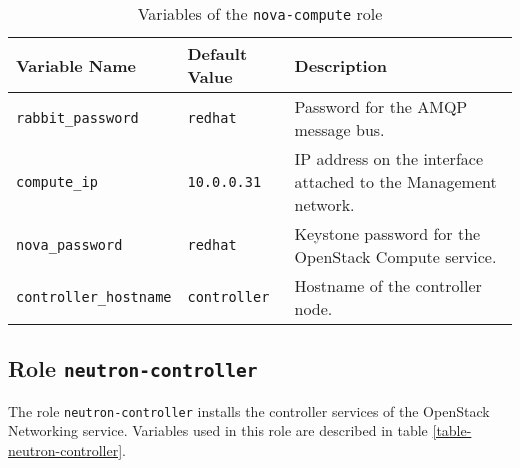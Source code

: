 \begin{table}[!h]
  \centering
  \begin{tabular}{|l|l|p{5cm}|}\hline
    Variable Name & Default Value & Description \\\hline
    \texttt{rabbit\_password} & \texttt{redhat} & Password for the AMQP message bus. \\\hline

    \texttt{compute\_ip} & \texttt{10.0.0.31} & IP address on the interface attached to the Management network. \\\hline
    \texttt{nova\_password} & \texttt{redhat} & Keystone password for the OpenStack Compute service. \\\hline
    \texttt{controller\_hostname} & \texttt{controller} & Hostname of the controller node. \\\hline

  \end{tabular}
\caption{Variables of the \texttt{nova-compute} role}
\label{table-nova-compute}
\end{table}

\subsection{Role \texttt{neutron-controller}}

The role \texttt{neutron-controller} installs the controller services of the OpenStack Networking service. Variables used in this role are described in table \ref{table-neutron-controller}.

